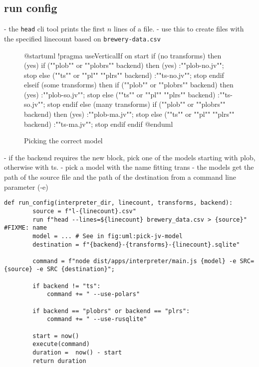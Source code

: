 \subsection{run config}
- the \Verb|head| cli tool prints the first $n$ lines of a file.
- use this to create files with the specified linecount based on \Verb|brewery-data.csv| %
\begin{figure}
	\begin{plantuml}
		@startuml
		!pragma useVerticalIf on
		start
		if (no transforms) then (yes)
		if (""plob"" or ""plobrs"" backend) then (yes)
		:""plob-no.jv"";
		stop
		else (""ts"" or ""pl"" ""plrs"" backend)
		:""ts-no.jv"";
		stop
		endif
		elseif (some transforms) then
		if (""plob"" or ""plobrs"" backend) then (yes)
		:""plob-so.jv"";
		stop
		else (""ts"" or ""pl"" ""plrs"" backend)
		:""ts-so.jv"";
		stop
		endif
		else (many transforms)
		if (""plob"" or ""plobrs"" backend) then (yes)
		:""plob-ma.jv"";
		stop
		else (""ts"" or ""pl"" ""plrs"" backend)
		:""ts-ma.jv"";
		stop
		endif
		endif
		@enduml
	\end{plantuml}
	\caption{Picking the correct model}\label{fig:uml:pick-jv-model}
\end{figure}
- if the backend requires the new block, pick one of the models starting with plob, otherwise with ts.
- pick a model with the name fitting trans
- the models get the path of the source file and the path of the destination from a command line parameter (-e)

\begin{listing}
	\begin{verbatim}
def run_config(interpreter_dir, linecount, transforms, backend):
		source = f"l-{linecount}.csv"
		run f"head --lines=${linecount} brewery_data.csv > {source}" #FIXME: name
		model = ... # See in fig:uml:pick-jv-model
		destination = f"{backend}-{transforms}-{linecount}.sqlite"

		command = f"node dist/apps/interpreter/main.js {model} -e SRC={source} -e SRC {destination}";

		if backend != "ts":
			command += " --use-polars"

		if backend == "plobrs" or backend == "plrs":
			command += " --use-rusqlite"

		start = now()
		execute(command)
		duration =  now() - start
		return duration
	\end{verbatim}
\end{listing}



